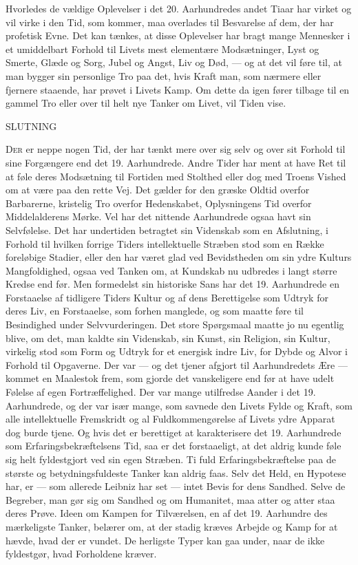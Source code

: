 \documentclass[12pt,a4paper,openany]{book}
\newcommand{\opage}[1]{\marginnote{\footnotesize\textit{[#1]}}}
\newcommand{\unnumhead}[1]{\par\bigskip\phantomsection\begin{center}{\Large #1}\end{center}\addcontentsline{toc}{chapter}{#1}\medskip}
\begin{document}
Hvorledes de vældige Oplevelser i det 20. Aarhundredes andet Tiaar
har virket og vil virke i den Tid, som kommer, maa overlades
til Besvarelse af dem, der har profetisk Evne. Det kan tænkes, at
disse Oplevelser har bragt mange Mennesker i et umiddelbart Forhold
til Livets mest elementære Modsætninger, Lyst og Smerte,
Glæde og Sorg, Jubel og Angst, Liv og Død, --- og at det vil føre til,
at man bygger sin personlige Tro paa det, hvis Kraft man, som nærmere
eller fjernere staaende, har prøvet i Livets Kamp. Om dette da
igen fører tilbage til en gammel Tro eller over til helt nye Tanker
om Livet, vil Tiden vise.

\unnumhead{SLUTNING}

\opage{152}D\textsc{er} er neppe nogen Tid, der har tænkt mere over sig selv og over
sit Forhold til sine Forgængere end det 19. Aarhundrede.
Andre Tider har ment at have Ret til at føle deres Modsætning til
Fortiden med Stolthed eller dog med Troens Vished om at være
paa den rette Vej. Det gælder for den græske Oldtid overfor Barbarerne,
kristelig Tro overfor Hedenskabet, Oplysningens Tid overfor
Middelalderens Mørke. Vel har det nittende Aarhundrede ogsaa
havt sin Selvfølelse. Det har undertiden betragtet sin Videnskab
som en Afslutning, i Forhold til hvilken forrige Tiders intellektuelle
Stræben stod som en Række foreløbige Stadier, eller den har været
glad ved Bevidstheden om sin ydre Kulturs Mangfoldighed, ogsaa
ved Tanken om, at Kundskab nu udbredes i langt større Kredse end
før. Men formedelst sin historiske Sans har det 19. Aarhundrede en
Forstaaelse af tidligere Tiders Kultur og af dens Berettigelse som
Udtryk for deres Liv, en Forstaaelse, som forhen manglede, og som
maatte føre til Besindighed under Selvvurderingen. Det store Spørgsmaal
maatte jo nu egentlig blive, om det, man kaldte sin Videnskab,
sin Kunst, sin Religion, sin Kultur, virkelig stod som Form
og Udtryk for et energisk indre Liv, for Dybde og Alvor i Forhold
til Opgaverne. Der var --- og det tjener afgjort til Aarhundredets
Ære --- kommet en Maalestok frem, som gjorde det vanskeligere
end før at have udelt Følelse af egen Fortræffelighed. Der var mange
utilfredse Aander i det 19. Aarhundrede, og der var især mange,
som savnede den Livets Fylde og Kraft, som alle intellektuelle Fremskridt
og al Fuldkommengørelse af Livets ydre Apparat dog burde
tjene. Og hvis det er berettiget at karakterisere det 19. Aarhundrede
som Erfaringsbekræftelsens Tid, saa er det forstaaeligt, at det aldrig
kunde føle sig helt fyldestgjort ved sin egen Stræben. Ti fuld Erfaringsbekræftelse
paa de største og betydningsfuldeste Tanker kan
aldrig faas. Selv det Held, en Hypotese har, er --- som allerede Leibniz
har set --- intet Bevis for dens Sandhed. Selve de Begreber, man
gør sig om Sandhed og om Humanitet, maa atter og atter staa deres
Prøve. Ideen om Kampen for Tilværelsen, en af det 19. Aarhundre%
\opage{153}des mærkeligste Tanker, belærer om, at der stadig kræves Arbejde
og Kamp for at hævde, hvad der er vundet. De herligste Typer kan
gaa under, naar de ikke fyldestgør, hvad Forholdene kræver.
\end{document}

